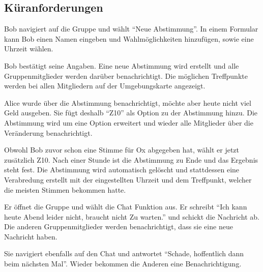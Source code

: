 \documentclass[parskip=full,11pt]{scrartcl}
\begin{document}
\pagebreak
\subsection{Küranforderungen}
{Bob navigiert auf die Gruppe und wählt \enquote{Neue Abstimmung}.}
{In einem Formular kann Bob einen Namen eingeben und Wahlmöglichkeiten hinzufügen,
	sowie eine Uhrzeit wählen.}

{Bob bestätigt seine Angaben.}
{Eine neue Abstimmung wird erstellt und alle Gruppenmitglieder werden darüber benachrichtigt.
Die möglichen Treffpunkte werden bei allen Mitgliedern auf der Umgebungskarte angezeigt.}

{Alice wurde über die Abstimmung benachrichtigt, möchte aber heute nicht viel Geld ausgeben.
Sie fügt deshalb \enquote{Z10} als Option zu der Abstimmung hinzu.}
{Die Abstimmung wird um eine Option erweitert und
wieder alle Mitglieder über die Veränderung benachrichtigt.}

{Obwohl Bob zuvor schon eine Stimme für Ox abgegeben hat, wählt er jetzt zusätzlich Z10.}
{Nach einer Stunde ist die Abstimmung zu Ende und das Ergebnis steht fest.
Die Abstimmung wird automatisch gelöscht und stattdessen eine Verabredung erstellt mit der
eingestellten Uhrzeit und dem Treffpunkt, welcher die meisten Stimmen bekommen hatte.}

\pagebreak
{}
{Er öffnet die Gruppe und wählt die Chat Funktion aus. Er schreibt \enquote{Ich kann heute Abend leider nicht, braucht nicht Zu warten.} und schickt die Nachricht ab.}
{Die anderen Gruppenmitglieder werden benachrichtigt, dass sie eine neue Nachricht haben.}

{Sie navigiert ebenfalls auf den Chat und antwortet \enquote{Schade, hoffentlich dann beim
nächsten Mal}.}
{Wieder bekommen die Anderen eine Benachrichtigung.}
\end{document}
